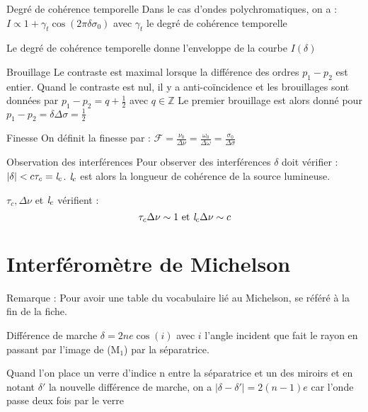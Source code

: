 \documentclass[french, a4paper, 11pt, twocolumn]{article}
\newcommand{\Z}{\mathbb{Z}}   %
\begin{document}
\begin{cadre}{Degré de cohérence temporelle}
    Dans le cas d'ondes polychromatiques, on a : \(I\propto 1+\gamma_t\cos(2\pi \delta \sigma_0)\) avec \(\gamma_t\) le degré de cohérence temporelle
    
    \tcblower
    Le degré de cohérence temporelle donne l'enveloppe de la courbe \(I(\delta)\)
\end{cadre}

\begin{cadre}{Brouillage}
    Le contraste est maximal lorsque la différence des ordres \(p_1-p_2\) est entier.
    Quand le contraste est nul, il y a anti-coïncidence et les brouillages sont données par \(p_1-p_2=q+\frac{1}{2}\) avec \(q\in \Z\)
    Le premier brouillage est alors donné pour \(p_1-p_2=\delta\Delta\sigma=\frac{1}{2}\)
\end{cadre}

\begin{cadre}{Finesse}
    On définit la finesse par : \(\mathcal{F}=\frac{\nu_0}{\Delta \nu}=\frac{\omega_0}{\Delta \omega}=\frac{\sigma_0}{\Delta \sigma}\)
\end{cadre}

\begin{cadre}{Observation des interférences}
    Pour observer des interférences \(\delta\) doit vérifier : \(|\delta|<c\tau_c=\emph{l}_c\).
    \(\emph{l}_c\) est alors la longueur de cohérence de la source lumineuse.

    \tcblower
    \(\tau_c, \Delta\nu\) et \(\emph{l}_c\) vérifient :
        \[\tau_c \Delta\nu \sim 1 \text{ et } \emph{l}_c \Delta\nu \sim c\]
\end{cadre}

\section{Interféromètre de Michelson}
Remarque : Pour avoir une table du vocabulaire lié au Michelson, se référé à la fin de la fiche.
\begin{cadre}{Différence de marche}
    \(\delta=2ne\cos(i)\) avec \(i\) l'angle incident que fait le rayon en passant par l'image de (M\(_1\)) par la séparatrice.
    
    \tcblower
    Quand l'on place un verre d'indice n entre la séparatrice et un des miroirs et en notant \(\delta'\) la nouvelle différence de marche,
    on a \(|\delta-\delta'|=2(n-1)e\) car l'onde passe deux fois par le verre
\end{cadre}
\end{document}
